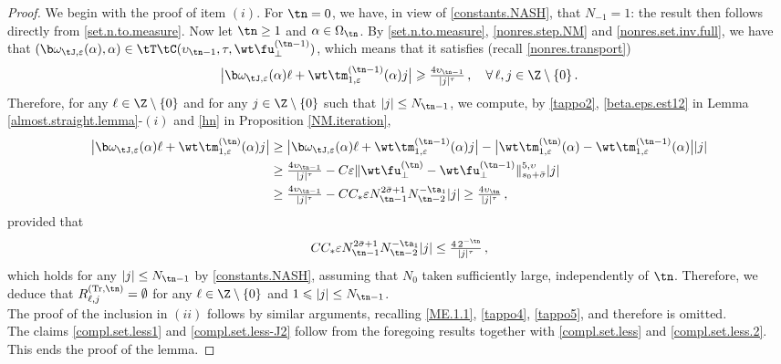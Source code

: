 \documentclass[a4paper,reqno,10pt]{article}
\begin{document}
\begin{proof}
    We begin with the proof of item $(i)$. For $\tn = 0$, we have, in view of \eqref{constants.NASH}, that $N_{-1} = 1$: the result then follows directly from \eqref{set.n.to.measure}. Now let $\tn \geq 1$ and $\alpha\in \Omega_{\tn}$. By \eqref{set.n.to.measure}, \eqref{nonres.step.NM} and \eqref{nonres.set.inv.full}, we have that $(\b\omega_{\tJ,\varepsilon}(\alpha),\alpha) \in \tT\tC(\upsilon_{\tn-1},\tau,\wt\fu_{\perp}^{(\tn-1)})
    $,  which means that it satisfies (recall \eqref{nonres.transport})
    \begin{equation}\label{tappo2}
        \big| \b\omega_{\tJ,\varepsilon}(\alpha)\ell +\wt\tm_{1,\varepsilon}^{(\tn-1)}(\alpha)j \big| \geqslant \tfrac{4\upsilon_{\tn-1}}{|j|^{\tau}} \,, \quad \forall\, \ell,j \in\Z\setminus\{0\} \,.
    \end{equation}
    Therefore, for any $\ell\in \Z\setminus\{0\}$ and for any $j\in\Z\setminus\{0\}$ such that $|j|\leq N_{\tn-1}$, we compute, by \eqref{tappo2}, \eqref{beta.eps.est12} in Lemma \ref{almost.straight.lemma}-$(i)$ and \eqref{hn} in Proposition \ref{NM.iteration},
    \begin{align}
        \big| \b\omega_{\tJ,\varepsilon}(\alpha)\ell +\wt\tm_{1,\varepsilon}^{(\tn)}(\alpha)j \big| &\geq \big| \b\omega_{\tJ,\varepsilon}(\alpha)\ell +\wt\tm_{1,\varepsilon}^{(\tn-1)}(\alpha)j \big| - \big| \wt\tm_{1,\varepsilon}^{(\tn)}(\alpha) - \wt\tm_{1,\varepsilon}^{(\tn-1)}(\alpha) \big| |j| \\
        & \geq \tfrac{4\upsilon_{\tn-1}}{|j|^{\tau}} - C \varepsilon \| \wt\fu_{\perp}^{(\tn)}-\wt\fu_{\perp}^{(\tn-1)} \|_{s_0+\bar\sigma}^{5,\upsilon} |j| \\
        & \geq \tfrac{4\upsilon_{\tn-1}}{|j|^{\tau}} - C C_{*} \varepsilon N_{\tn-1}^{2\bar\sigma+1} N_{\tn-2}^{-\ta_{1}} |j| \geq \tfrac{4\upsilon_{\tn}}{|j|^{\tau}} \,,
    \end{align}
   provided  that
    \begin{equation}
         C C_{*} \varepsilon N_{\tn-1}^{2\bar\sigma+1} N_{\tn-2}^{-\ta_{1}} |j| 
         \leq \tfrac{4\,2^{-\tn}}{|j|^{\tau}}\,, 
    \end{equation}
    which holds for any $|j|\leq N_{\tn-1}$ by \eqref{constants.NASH}, assuming that  $N_{0}$ taken  sufficiently large, independently of $\tn$. Therefore, we deduce that  $R_{\ell,j}^{({\rm Tr},\tn)}=\emptyset$ for any $\ell\in \Z \setminus \{0\}$ and $1\leqslant |j|\leq N_{\tn-1}$. \\
    The proof of the inclusion in $(ii)$ follows by similar arguments, recalling \eqref{ME.1.1}, \eqref{tappo4}, \eqref{tappo5}, and therefore is omitted. \\The  claims \eqref{compl.set.less1} and \eqref{compl.set.less-J2} follow from the foregoing results together with \eqref{compl.set.less} and \eqref{compl.set.less.2}.
    This ends the proof of the lemma.
\end{proof}
\end{document}

